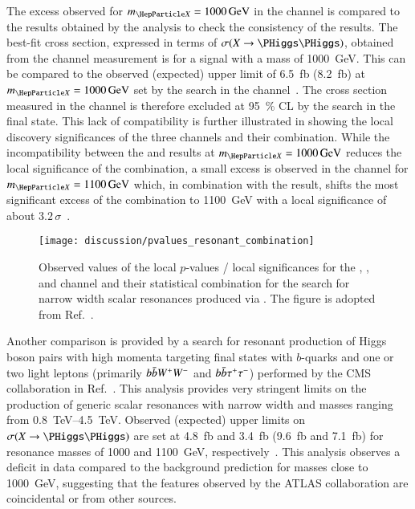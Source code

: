 The excess observed for $\mX = \SI{1000}{\GeV}$ in the \bbtautau channel is
compared to the results obtained by the \bbbb analysis to check the consistency
of the results. The best-fit cross section, expressed in terms of
$\sigma(X \to \HH)$, obtained from the \bbtautau channel measurement is
 for a signal with a mass of
\SI{1000}{\GeV}. This can be compared to the observed (expected) upper limit of
\SI{6.5}{\femto\barn} (\SI{8.2}{\femto\barn}) at $\mX = \SI{1000}{\GeV}$ set by
the search in the \bbbb channel~\cite{HDBS-2018-41,hepdata.111124}. The cross
section measured in the \bbtautau channel is therefore excluded at
\SI{95}{\percent} CL by the search in the \bbbb final state. This lack of
compatibility is further illustrated in 
showing the local discovery significances of the three channels and their
combination. While the incompatibility between the \bbtautau and \bbbb results
at $\mX = \SI{1000}{\GeV}$ reduces the local significance of the combination, a
small excess is observed in the \bbbb channel for $\mX = \SI{1100}{\GeV}$ which,
in combination with the \bbtautau result, shifts the most significant excess of
the combination to \SI{1100}{\GeV} with a local significance of about
$3.2\,\sigma$~\cite{ATLAS-CONF-2021-052}.


\begin{figure}[htbp]
  \centering

  \texttt{[image: discussion/pvalues\_resonant\_combination]}

  \caption{Observed values of the local $p$-values / local significances for the
    \bbbb, \bbtautau, and \bbyy channel and their statistical combination for
    the search for narrow width scalar resonances produced via \ggF. The figure
    is adopted from Ref.~\cite{ATLAS-CONF-2021-052}.}
  \label{fig:resonant_hh_comb_pvalues}

\end{figure}

Another comparison is provided by a search for resonant production of Higgs
boson pairs with high momenta targeting final states with $b$-quarks and one or
two light leptons (primarily $b\bar{b} W^+ W^-$ and $b\bar{b} \tau^+ \tau^-$)
performed by the CMS collaboration in Ref.~\cite{CMS-B2G-20-007}. This analysis
provides very stringent limits on the production of generic scalar resonances
with narrow width and masses ranging from \SIrange{0.8}{4.5}{\TeV}. Observed
(expected) upper limits on $\sigma(X \to \HH)$ are set at \SI{4.8}{\femto\barn}
and \SI{3.4}{\femto\barn} (\SI{9.6}{\femto\barn} and \SI{7.1}{\femto\barn}) for
resonance masses of \num{1000} and \SI{1100}{\GeV},
respectively~\cite{CMS-B2G-20-007,hepdata.115024}. This analysis observes a
deficit in data compared to the background prediction for masses close to
\SI{1000}{\GeV}, suggesting that the features observed by the ATLAS
collaboration are coincidental or from other sources.

